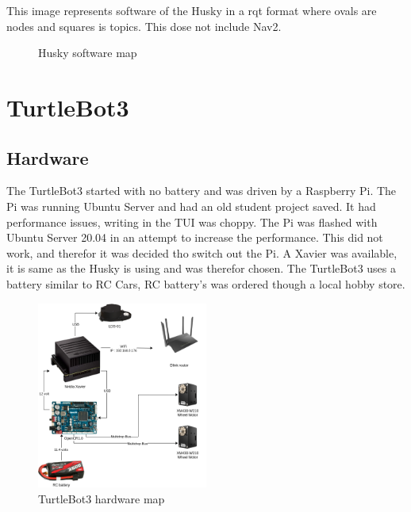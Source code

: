 This image represents software of the Husky in a rqt format where ovals are nodes and squares is topics. This dose not include Nav2. 
\begin{figure}[H]
    \centering
    
    \caption{Husky software map}
    \label{fig:HuskySW}
\end{figure}


\section{TurtleBot3}
\subsection{Hardware}
The TurtleBot3 started with no battery and was driven by a Raspberry Pi. The Pi was running Ubuntu Server and had an old student project saved. It had performance issues, writing in the TUI was choppy. The Pi was flashed with Ubuntu Server 20.04 in an attempt to increase the performance. This did not work, and therefor it was decided tho switch out the Pi. A Xavier was available, it is same as the Husky is using and was therefor chosen. The TurtleBot3 uses a battery similar to RC Cars, RC battery's was ordered though a local hobby store. 

\begin{figure}[H]
    \centering
    \includegraphics[width = 0.5\textwidth]{Figures/drawio/TB_HW.drawio.png}
    \caption{TurtleBot3 hardware map}
    \label{fig:TB3Hardware}
\end{figure}

